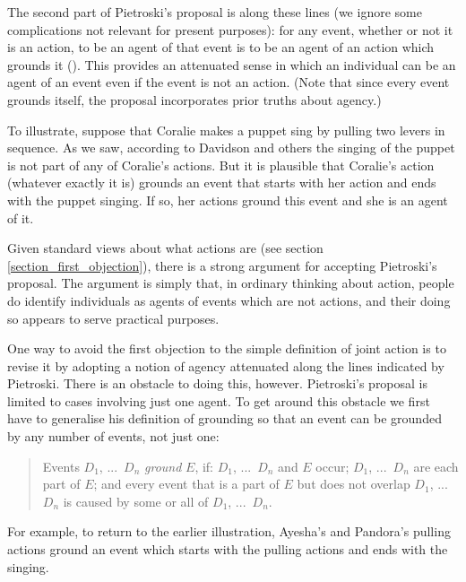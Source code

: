 \documentclass[12pt,a4paper]{extarticle}
\begin{document}
The second part of Pietroski's proposal is along these lines (we ignore some complications not relevant for present purposes): for any event, whether or not it is an action, to be an agent of that event is to be an agent of an action which grounds it 
(\citeyear[p.\ 82]{pietroski_actions_1998}).
This provides an attenuated sense in which an individual can be an agent of an event even if the event is not an action.
(Note that since every event grounds itself, the proposal incorporates prior truths about agency.)

To illustrate, suppose that Coralie makes a puppet sing by pulling two levers in sequence.
As we saw, according to Davidson and others the singing of the puppet is not part of any of Coralie's  actions.
But it is plausible that Coralie's action (whatever exactly it is)  grounds an event that starts with her action and ends with the puppet singing.
If so, her actions ground this event and she is an agent of it. 

Given standard views about what actions are (see section \vref{section_first_objection}), there is a strong argument for accepting Pietroski's proposal.
The argument is simply that, in ordinary thinking about action, people do identify individuals as agents of events which are not actions, and their doing so appears to serve practical purposes.

One way to avoid the first objection to the simple definition of joint action is to revise it by adopting a notion of agency attenuated along the lines indicated by Pietroski.
There is an obstacle to doing this, however.
Pietroski's proposal is limited to cases involving just one agent.
To get around this obstacle we first have to generalise his definition of grounding so that an event can be grounded by any number of events, not just one:
%
\begin{quote}
	\label{df_plural_grounding}	
Events $D_1$, ...\ $D_n$ \emph{ground} $E$, if: $D_1$, ...\ $D_n$ and $E$ occur; 
$D_1$, ...\ $D_n$ are each part of $E$; and 
every event that is 
	a part of $E$
	but does not overlap $D_1$, ...\ $D_n$ 
is caused by some or all of $D_1$, ...\ $D_n$.
\end{quote}
%
For example, to return to the earlier illustration, Ayesha's and Pandora's pulling actions ground an event which starts with the pulling actions and ends with the singing.
\end{document}
